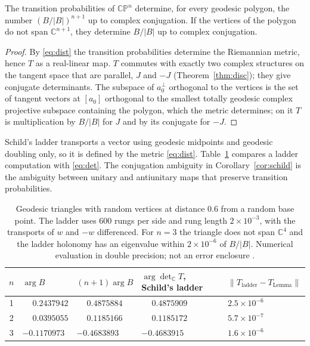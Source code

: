 \begin{corollary}\label{cor:schild}
The transition probabilities of $\mathbb{CP}^n$ determine, for every geodesic polygon, the number $(B/|B|)^{n+1}$ up to complex conjugation. If the vertices of the polygon do not span $\mathbb{C}^{n+1}$, they determine $B/|B|$ up to complex conjugation.
\end{corollary}
\begin{proof}
By \eqref{eq:dist} the transition probabilities determine the Riemannian metric, hence $T$ as a real-linear map. $T$ commutes with exactly two complex structures on the tangent space that are parallel, $J$ and $-J$ (Theorem~\ref{thm:disc}); they give conjugate determinants. The subspace of $a_0^\perp$ orthogonal to the vertices is the set of tangent vectors at $[a_0]$ orthogonal to the smallest totally geodesic complex projective subspace containing the polygon, which the metric determines; on it $T$ is multiplication by $B/|B|$ for $J$ and by its conjugate for $-J$.
\end{proof}

Schild's ladder transports a vector using geodesic midpoints and geodesic doubling only, so it is defined by the metric \eqref{eq:dist}. Table~\ref{tab:schild} compares a ladder computation with \eqref{eq:det}. The conjugation ambiguity in Corollary~\ref{cor:schild} is the ambiguity between unitary and antiunitary maps that preserve transition probabilities.

\begin{table}[ht]\centering\small
\begin{tabular}{@{}cllll@{}}\toprule
$n$ & $\arg B$ & $(n+1)\arg B$ & $\arg\det_{\mathbb{C}}T$, Schild's ladder & $\lVert T_{\mathrm{ladder}}-T_{\mathrm{Lemma}}\rVert$\\\midrule
1 & $\phantom{-}0.2437942$ & $\phantom{-}0.4875884$ & $\phantom{-}0.4875909$ & $2.5\times10^{-6}$\\
2 & $\phantom{-}0.0395055$ & $\phantom{-}0.1185166$ & $\phantom{-}0.1185172$ & $5.7\times10^{-7}$\\
3 & $-0.1170973$ & $-0.4683893$ & $-0.4683915$ & $1.6\times10^{-6}$\\\bottomrule
\end{tabular}
\caption{Geodesic triangles with random vertices at distance $0.6$ from a random base point. The ladder uses $600$ rungs per side and rung length $2\times10^{-3}$, with the transports of $w$ and $-w$ differenced. For $n=3$ the triangle does not span $\mathbb{C}^4$ and the ladder holonomy has an eigenvalue within $2\times10^{-6}$ of $B/|B|$. Numerical evaluation in double precision; not an error enclosure \cite{comp}.}\label{tab:schild}
\end{table}

